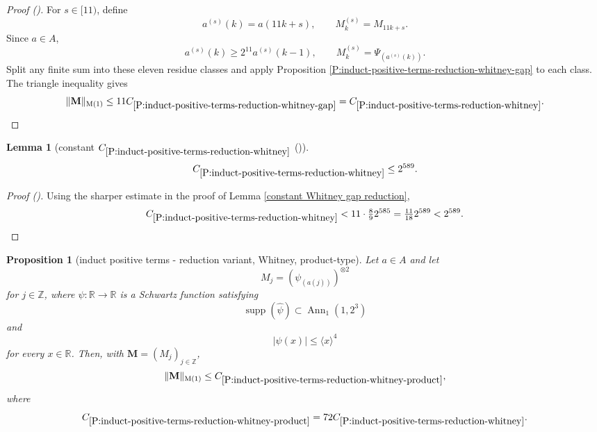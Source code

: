\documentclass[12pt,reqno]{amsart}
\newcommand{\auto}{{({\tiny\faCar})}}
\theoremstyle{plain}
\newtheorem{lemma}[theorem]{Lemma}
\newtheorem{proposition}[theorem]{Proposition}
\numberwithin{equation}{section}
\theoremstyle{remark}
\newcommand{\using}[1]{}
\newcommand{\Z}{{\mathbb Z}}
\newcommand{\R}{{\mathbb R}}
\newcommand{\M}{\mathbf{M}}
\begin{document}
\begin{proof}[Proof \auto]
For $s\in[11)$, define
\[
a^{(s)}(k)=a(11k+s),
\qquad
M^{(s)}_k=M_{11k+s}.
\]
Since $a\in A$,
\[
a^{(s)}(k)\ge2^{11}a^{(s)}(k-1),
\qquad
M^{(s)}_k=\Psi_{(a^{(s)}(k))}.
\]
Split any finite sum into these eleven residue classes and apply Proposition \ref{P:induct-positive-terms-reduction-whitney-gap} to each class. The triangle inequality gives
\[
\|\M\|_{\rm M(1)}
\le11C_{\ref{P:induct-positive-terms-reduction-whitney-gap}}
= C_{\ref{P:induct-positive-terms-reduction-whitney}}.
\]
\end{proof}

\begin{lemma}[constant $C_{\ref{P:induct-positive-terms-reduction-whitney}}$ \auto]\label{constant Whitney reduction}\using{constant Whitney gap reduction}\using{P:induct-positive-terms-reduction-whitney}
\begin{equation}\label{constant Whitney reduction bound}
C_{\ref{P:induct-positive-terms-reduction-whitney}}\le2^{589}.
\end{equation}
\end{lemma}
\begin{proof}[Proof \auto]
Using the sharper estimate in the proof of Lemma \ref{constant Whitney gap reduction},
\[
C_{\ref{P:induct-positive-terms-reduction-whitney}}
<11\cdot\tfrac89 2^{585}
=\tfrac{11}{18}2^{589}<2^{589}.
\]
\end{proof}


\begin{proposition}[induct positive terms - reduction variant, Whitney, product-type]
\label{P:induct-positive-terms-reduction-whitney-product}\using{P:induct-positive-terms-reduction-whitney-gap}\using{P:induct-positive-terms-reduction-whitney}
Let $a\in A$ and let
\begin{equation}\label{auto:Whitney-product-kernel}
M_j=(\psi_{(a(j))})^{\otimes2}
\end{equation}
for $j\in\Z$, where $\psi:\R\to\R$ is a Schwartz function satisfying
\begin{equation}\label{1-on-W_supp}
\operatorname{supp}(\widehat\psi)\subset\operatorname{Ann}_1(1,2^3)
\end{equation}
and
\begin{equation}\label{Whitney product decay assumption}
|\psi(x)|\le\langle x\rangle^4
\end{equation}
for every $x\in\R$. Then, with $\M=(M_j)_{j\in\Z}$,
\begin{equation}\label{auto:Whitney-product-reduction-bound}
\|\M\|_{{\rm M}(1)}\le C_{\ref{P:induct-positive-terms-reduction-whitney-product}},
\end{equation}
where
\begin{equation}\label{auto:Whitney-product-constant-definition}
C_{\ref{P:induct-positive-terms-reduction-whitney-product}}
=72C_{\ref{P:induct-positive-terms-reduction-whitney}}.
\end{equation}
\end{proposition}
\end{document}
